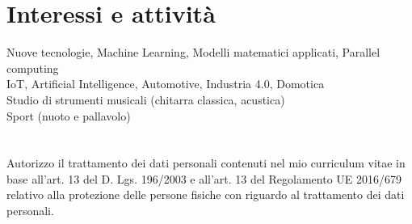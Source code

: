 \documentclass[a4paper,10pt]{article} %
\begin{document}
\section{Interessi e attività}

Nuove tecnologie, Machine Learning, Modelli matematici applicati, Parallel computing\\
IoT, Artificial Intelligence, Automotive, Industria 4.0, Domotica\\
Studio di strumenti musicali (chitarra classica, acustica)\\
Sport (nuoto e pallavolo)


\section{}
Autorizzo il trattamento dei dati personali contenuti nel mio curriculum vitae in base all’art. 13 del D. Lgs. 196/2003 e all’art. 13 del Regolamento UE 2016/679 relativo alla protezione delle persone fisiche con riguardo al trattamento dei dati personali.
\end{document}
